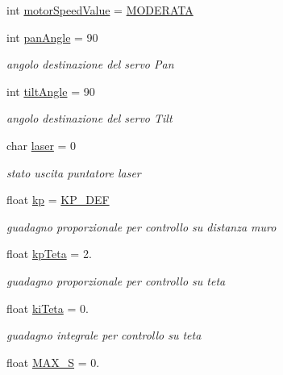 \begin{DoxyCompactItemize}
int \mbox{\hyperlink{ari_pi__2_d_c__esp__08_8ino_a6c202cc2e1ecd2889d313233e5360ae9}{motor\+Speed\+Value}} = \mbox{\hyperlink{ari_pi__2_d_c__esp__08_8ino_a4774b749cfc65db93b2e726543c9115f}{M\+O\+D\+E\+R\+A\+TA}}
\item 
int \mbox{\hyperlink{ari_pi__2_d_c__esp__08_8ino_a41052b199a87567ee2438e605f1f949d}{pan\+Angle}} = 90
\begin{DoxyCompactList}\small\item\em angolo destinazione del servo Pan \end{DoxyCompactList}\item 
int \mbox{\hyperlink{ari_pi__2_d_c__esp__08_8ino_ad64f6da25c8c1de30ddeb9e0541fa839}{tilt\+Angle}} = 90
\begin{DoxyCompactList}\small\item\em angolo destinazione del servo Tilt \end{DoxyCompactList}\item 
char \mbox{\hyperlink{ari_pi__2_d_c__esp__08_8ino_aa9eb73e0d7151ab1d50ab7d71114e6bd}{laser}} = 0
\begin{DoxyCompactList}\small\item\em stato uscita puntatore laser \end{DoxyCompactList}\item 
float \mbox{\hyperlink{ari_pi__2_d_c__esp__08_8ino_a1f7add0f84d583bc2eceb290d6c4cc06}{kp}} = \mbox{\hyperlink{ari_pi__2_d_c__esp__08_8ino_a8226ade05454c12b2636c063d60f0050}{K\+P\+\_\+\+D\+EF}}
\begin{DoxyCompactList}\small\item\em guadagno proporzionale per controllo su distanza muro \end{DoxyCompactList}\item 
float \mbox{\hyperlink{ari_pi__2_d_c__esp__08_8ino_a6f825712ede5cd29e0ee8a3b8603fa5f}{kp\+Teta}} = 2.
\begin{DoxyCompactList}\small\item\em guadagno proporzionale per controllo su teta \end{DoxyCompactList}\item 
float \mbox{\hyperlink{ari_pi__2_d_c__esp__08_8ino_ad59a70cc86150e574e73066bf9b92062}{ki\+Teta}} = 0.
\begin{DoxyCompactList}\small\item\em guadagno integrale per controllo su teta \end{DoxyCompactList}\item 
float \mbox{\hyperlink{ari_pi__2_d_c__esp__08_8ino_a33a1abc735507147bab601374a138b09}{M\+A\+X\+\_\+S}} = 0.

\end{DoxyCompactItemize}
